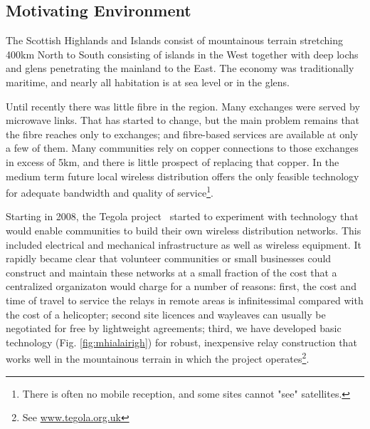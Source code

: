 \subsection{Motivating Environment}
The Scottish Highlands and Islands consist of mountainous  terrain stretching 400km North to South consisting of islands in the West together with deep lochs and glens penetrating the mainland to the East.  The economy was traditionally maritime, and nearly all habitation is at sea level or in the glens.

Until recently there was little fibre in the region.  Many exchanges were served by microwave links. That has started to change, but the main problem remains that the fibre reaches only to exchanges; and fibre-based services are available at only a few of them.  Many communities rely on copper connections to those exchanges in excess of 5km, and there is little prospect of replacing that copper.  In the medium term future local wireless distribution offers the only feasible technology for adequate bandwidth and quality of service\footnote{There is often no mobile reception, and some sites cannot "see" satellites.}.

Starting in 2008, the Tegola project~\cite{tegola} started to experiment with technology that would enable communities to build their own wireless distribution networks.  This included electrical and mechanical infrastructure as well as wireless equipment.  It rapidly became clear that volunteer communities or small businesses could construct and maintain these networks at a small fraction of the cost that a centralized organizaton would charge for a number of reasons: first, the cost and time of travel to service the relays in remote areas is infinitessimal compared with the cost of a helicopter; second site licences and wayleaves can usually be negotiated for free by lightweight agreements; third, we have developed basic technology (Fig. \ref{fig:mhialairigh}) for robust, inexpensive relay construction that works well in the mountainous terrain in which the project operates\footnote{See \url{www.tegola.org.uk}}.

